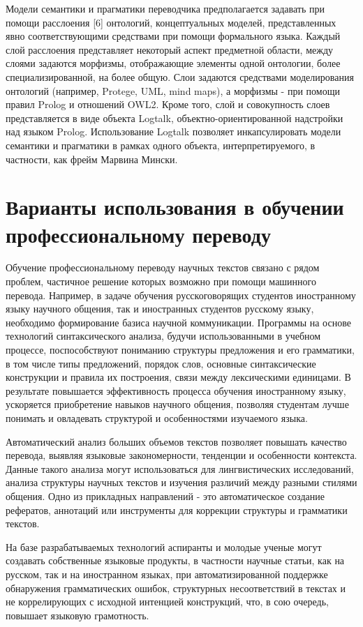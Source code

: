 \documentclass[
]{ceurart}
\begin{document}
Модели семантики и прагматики переводчика предполагается задавать при
помощи расслоения {[}6{]} онтологий, концептуальных моделей,
представленных явно соответствующими средствами при помощи формального
языка. Каждый слой расслоения представляет некоторый аспект предметной
области, между слоями задаются морфизмы, отображающие элементы одной
онтологии, более специализированной, на более общую. Слои задаются
средствами моделирования онтологий (например, Protege, UML, mind maps),
а морфизмы - при помощи правил Prolog и отношений OWL2. Кроме того, слой
и совокупность слоев представляется в виде объекта Logtalk,
объектно-ориентированной надстройки над языком Prolog. Использование
Logtalk позволяет инкапсулировать модели семантики и прагматики в рамках
одного объекта, интерпретируемого, в частности, как фрейм Марвина
Мински.

\section{Варианты использования в обучении профессиональному переводу}

Обучение профессиональному переводу научных текстов связано с рядом
проблем, частичное решение которых возможно при помощи машинного
перевода. Например, в задаче обучения русскоговорящих студентов
иностранному языку научного общения, так и иностранных студентов
русскому языку, необходимо формирование базиса научной коммуникации.
Программы на основе технологий синтаксического анализа, будучи
использованными в учебном процессе, поспособствуют пониманию структуры
предложения и его грамматики, в том числе типы предложений, порядок
слов, основные синтаксические конструкции и правила их построения, связи
между лексическими единицами. В результате повышается эффективность
процесса обучения иностранному языку, ускоряется приобретение навыков
научного общения, позволяя студентам лучше понимать и овладевать
структурой и особенностями изучаемого языка.

Автоматический анализ больших объемов текстов позволяет повышать
качество перевода, выявляя языковые закономерности, тенденции и
особенности контекста. Данные такого анализа могут использоваться для
лингвистических исследований, анализа структуры научных текстов и
изучения различий между разными стилями общения. Одно из прикладных
направлений - это автоматическое создание рефератов, аннотаций или
инструменты для коррекции структуры и грамматики текстов.

На базе разрабатываемых технологий аспиранты и молодые ученые могут
создавать собственные языковые продукты, в частности научные статьи, как
на русском, так и на иностранном языках, при автоматизированной
поддержке обнаружения грамматических ошибок, структурных несоответствий
в текстах и не коррелирующих с исходной интенцией конструкций, что, в
сою очередь, повышает языковую грамотность.
\end{document}
